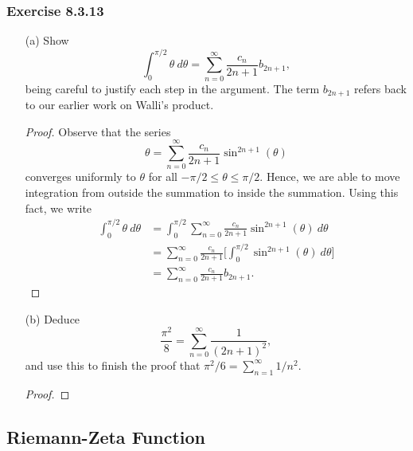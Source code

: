 \subsubsection{Exercise 8.3.13} 
\begin{enumerate}
    \item[(a)] Show 
        \[  \int_{ 0 }^{ \pi /2    }  \theta  \  d \theta = \sum_{ n=0 }^{ \infty  } \frac{ c_{n}  }{  2n+1  }  b_{2n+1},   \] being careful to justify each step in the argument. The term \( b_{2n+1} \) refers back to our earlier work on Walli's product.
        \begin{proof}
        Observe that the series
        \[  \theta = \sum_{ n=0  }^{ \infty  } \frac{ c_{n}  }{ 2n+1  }  \sin^{2n+1} (\theta)  \] converges uniformly to \( \theta  \) for all \( - \pi /2 \leq \theta \leq \pi /2  \). Hence, we are able to move integration from outside the summation to inside the summation. Using this fact, we write 
        \begin{align*}
            \int_{ 0 }^{ \pi / 2  } \theta \ d\theta &= \int_{ 0  }^{ \pi /2  } \sum_{ n=0 }^{ \infty  }  \frac{ c_{n}  }{  2n + 1 } \sin^{2n+1}(\theta) \  d\theta   \\
                                                     &= \sum_{ n=0 }^{ \infty  } \frac{ c_{n}  }{  2n+1  }  \Big[ \int_{ 0 }^{ \pi /2  } \sin^{2n+1}(\theta)  \ d \theta  \Big] \\
                                                     &= \sum_{ n=0  }^{ \infty   } \frac{ c_{n}  }{  2n + 1  }  b_{2n+1}. \tag{Walli's Formula}
        \end{align*}
        \end{proof}
    \item[(b)] Deduce 
        \[  \frac{ \pi^{2}  }{  8  } = \sum_{ n=0  }^{ \infty  } \frac{ 1 }{ (2n+1)^{2} },  \] and use this to finish the proof that \( \pi^{2} / 6  = \sum_{ n=1 }^{ \infty  } 1 / n^{2} \).
        \begin{proof}
        
        \end{proof}
\end{enumerate}

\subsection{Riemann-Zeta Function}








